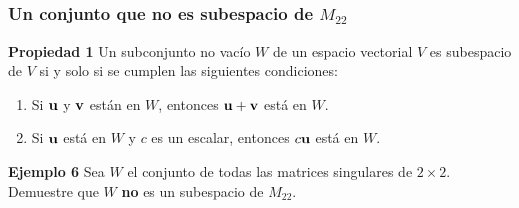 
\subsection{}

\begin{frame}\frametitle{Un conjunto que no es subespacio de $M_{22}$}

\begin{prop}{\textbf{Propiedad 1}}
\justifying
Un subconjunto no vacío $W$ de un espacio vectorial $V$ es {\color{red} subespacio} 
de $V$ si y solo si se cumplen las siguientes condiciones:
\begin{enumerate}
	\item[\labelname{$a$}] Si $\mathbf{u}$ y $\mathbf{v}$ están en $W$, entonces $\mathbf{u}+\mathbf{v}$ está en $W$.
	\item[\labelname{$b$}] Si $\mathbf{u}$ está en $W$ y $c$ es un escalar, entonces $c\mathbf{u}$ está en $W$.
\end{enumerate}
\end{prop}

\begin{ej}{\textbf{Ejemplo 6}}\justifying
Sea $W$ el conjunto de todas las matrices singulares de $2\times 2$. Demuestre que $W$ \textbf{no} es
un subespacio de $M_{22}$.
\end{ej}

\end{frame}


\subsection{}

